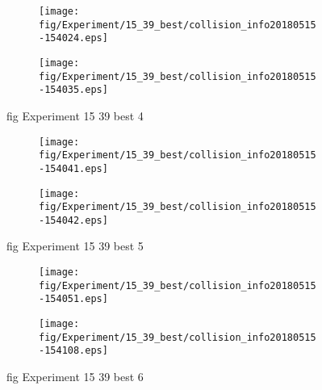 \begin{figure}[H]
	\centering
	\begin{subfigure}[b]{0.9\textwidth}
		\texttt{[image: fig/Experiment/15\_39\_best/collision\_info20180515-154024.eps]}
		\caption{}
		\label{fig:Experiment:15_39_best:collision_info20180515-154024}
	\end{subfigure}

	\begin{subfigure}[b]{0.9\textwidth}
		\texttt{[image: fig/Experiment/15\_39\_best/collision\_info20180515-154035.eps]}
		\caption{}
		\label{fig:Experiment:15_39_best:collision_info20180515-154035}
	\end{subfigure}
	\caption{fig Experiment 15 39 best 4}
	\label{fig:Experiment:15_39_best:4}
\end{figure}

\begin{figure}[H]
	\centering
	\begin{subfigure}[b]{0.9\textwidth}
		\texttt{[image: fig/Experiment/15\_39\_best/collision\_info20180515-154041.eps]}
		\caption{}
		\label{fig:Experiment:15_39_best:collision_info20180515-154041}
	\end{subfigure}

	\begin{subfigure}[b]{0.9\textwidth}
		\texttt{[image: fig/Experiment/15\_39\_best/collision\_info20180515-154042.eps]}
		\caption{}
		\label{fig:Experiment:15_39_best:collision_info20180515-154042}
	\end{subfigure}
	\caption{fig Experiment 15 39 best 5}
	\label{fig:Experiment:15_39_best:5}
\end{figure}

\begin{figure}[H]
	\centering
	\begin{subfigure}[b]{0.9\textwidth}
		\texttt{[image: fig/Experiment/15\_39\_best/collision\_info20180515-154051.eps]}
		\caption{}
		\label{fig:Experiment:15_39_best:collision_info20180515-154051}
	\end{subfigure}

	\begin{subfigure}[b]{0.9\textwidth}
		\texttt{[image: fig/Experiment/15\_39\_best/collision\_info20180515-154108.eps]}
		\caption{}
		\label{fig:Experiment:15_39_best:collision_info20180515-154108}
	\end{subfigure}
	\caption{fig Experiment 15 39 best 6}
	\label{fig:Experiment:15_39_best:6}
\end{figure}

